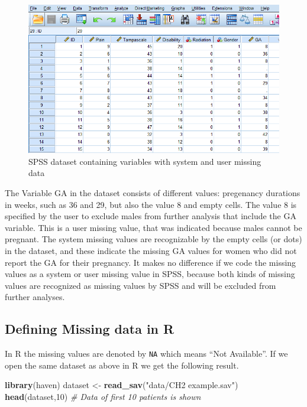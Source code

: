 \documentclass[]{book}
\newenvironment{Shaded}{\begin{snugshade}}{\end{snugshade}}
\newcommand{\KeywordTok}[1]{\textcolor[rgb]{0.13,0.29,0.53}{\textbf{#1}}}
\newcommand{\DecValTok}[1]{\textcolor[rgb]{0.00,0.00,0.81}{#1}}
\newcommand{\StringTok}[1]{\textcolor[rgb]{0.31,0.60,0.02}{#1}}
\newcommand{\CommentTok}[1]{\textcolor[rgb]{0.56,0.35,0.01}{\textit{#1}}}
\newcommand{\NormalTok}[1]{#1}
\begin{document}
\begin{figure}

{\centering \includegraphics[width=0.9\linewidth]{images/fig2.1} 

}

\caption{SPSS dataset containing variables with system and user missing data}\label{fig:fig2-1}
\end{figure}

The Variable GA in the dataset consists of different values: pregenancy
durations in weeks, such as 36 and 29, but also the value 8 and empty
cells. The value 8 is specified by the user to exclude males from
further analysis that include the GA variable. This is a user missing
value, that was indicated because males cannot be pregnant. The system
missing values are recognizable by the empty cells (or dots) in the
dataset, and these indicate the missing GA values for women who did not
report the GA for their pregnancy. It makes no difference if we code the
missing values as a system or user missing value in SPSS, because both
kinds of missing values are recognized as missing values by SPSS and
will be excluded from further analyses.

\subsection{Defining Missing data in
R}\label{defining-missing-data-in-r}

In R the missing values are denoted by \texttt{NA} which means ``Not
Available''. If we open the same dataset as above in R we get the
following result.

\begin{Shaded}
\begin{Highlighting}[]
\KeywordTok{library}\NormalTok{(haven)}
\NormalTok{dataset <-}\StringTok{ }\KeywordTok{read_sav}\NormalTok{(}\StringTok{"data/CH2 example.sav"}\NormalTok{)}
\KeywordTok{head}\NormalTok{(dataset,}\DecValTok{10}\NormalTok{) }\CommentTok{# Data of first 10 patients is shown}
\end{Highlighting}
\end{Shaded}
\end{document}

